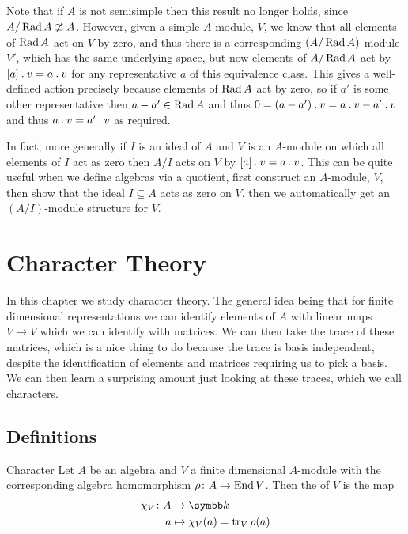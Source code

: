 Note that if \(A\) is not semisimple then this result no longer holds, since \(A/\operatorname{Rad} A \ncong A\).
However, given a simple \(A\)-module, \(V\), we know that all elements of \(\operatorname{Rad} A\) act on \(V\) by zero, and thus there is a corresponding \((A/\operatorname{Rad} A)\)-module \(V'\), which has the same underlying space, but now elements of \(A/\operatorname{Rad} A\) act by \([a] \mathbin{.} v = a \mathbin{.} v\) for any representative \(a\) of this equivalence class.
This gives a well-defined action precisely because elements of \(\operatorname{Rad} A\) act by zero, so if \(a'\) is some other representative then \(a - a' \in \operatorname{Rad} A\) and thus \(0 = (a - a') \mathbin{.} v = a \mathbin{.} v - a' \mathbin{.} v\) and thus \(a \mathbin{.} v = a' \mathbin{.} v\) as required.

In fact, more generally if \(I\) is an ideal of \(A\) and \(V\) is an \(A\)-module on which all elements of \(I\) act as zero then \(A/I\) acts on \(V\) by \([a] \mathbin{.} v = a \mathbin{.} v\).
This can be quite useful when we define algebras via a quotient, first construct an \(A\)-module, \(V\), then show that the ideal \(I \subseteq A\) acts as zero on \(V\), then we automatically get an \((A/I)\)-module structure for \(V\).

\chapter{Character Theory}
In this chapter we study character theory.
The general idea being that for finite dimensional representations we can identify elements of \(A\) with linear maps \(V \to V\) which we can identify with matrices.
We can then take the trace of these matrices, which is a nice thing to do because the trace is basis independent, despite the identification of elements and matrices requiring us to pick a basis.
We can then learn a surprising amount just looking at these traces, which we call characters.

\section{Definitions}
\begin{dfn}{Character}{}
    Let \(A\) be an algebra and \(V\) a finite dimensional \(A\)-module with the corresponding algebra homomorphism \(\rho \colon A \to \operatorname{End} V\).
    Then the  of \(V\) is the map
    \begin{align}
        \chi_V \colon A &\to \field\\
        a &\mapsto \chi_V(a) = \tr_V \rho(a)
    \end{align}
\end{dfn}

